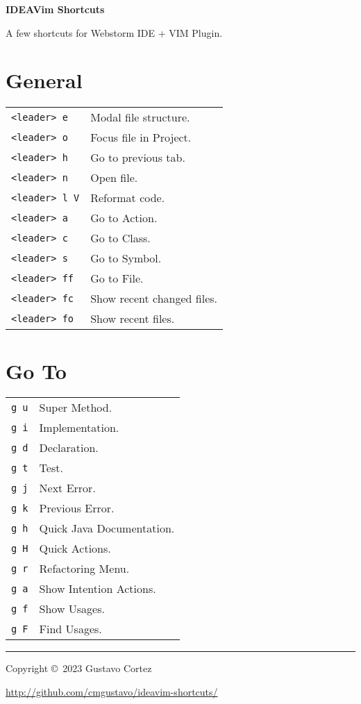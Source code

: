 \documentclass[10pt,landscape]{article}
\begin{document}
\begin{center}
     \Large{\textbf{IDEAVim Shortcuts}} \\
\end{center}

\begin{description}
  \item A few shortcuts for Webstorm IDE + VIM Plugin.
\end{description}


\begin{multicols}{2}

\section{General}
\begin{tabular}{@{}ll@{}}
\verb!<leader> e!    & Modal file structure. \\
\verb!<leader> o!    & Focus file in Project. \\
\verb!<leader> h!    & Go to previous tab. \\
\verb!<leader> n!    & Open file. \\
\verb!<leader> l V!  & Reformat code. \\
\verb!<leader> a!    & Go to Action. \\
\verb!<leader> c!    & Go to Class. \\
\verb!<leader> s!    & Go to Symbol. \\
\verb!<leader> ff!   & Go to File. \\
\verb!<leader> fc!   & Show recent changed files. \\
\verb!<leader> fo!   & Show recent files.
\end{tabular}

\section{Go To}
\begin{tabular}{@{}ll@{}}
  \verb!g u!    & Super Method. \\
  \verb!g i!    & Implementation. \\
  \verb!g d!    & Declaration. \\
  \verb!g t!    & Test. \\
  \verb!g j!    & Next Error. \\
  \verb!g k!    & Previous Error. \\
  \verb!g h!    & Quick Java Documentation. \\
  \verb!g H!    & Quick Actions. \\
  \verb!g r!    & Refactoring Menu. \\
  \verb!g a!    & Show Intention Actions. \\
  \verb!g f!    & Show Usages. \\
  \verb!g F!    & Find Usages.
\end{tabular}

\end{multicols}

\rule{\linewidth}{0.25pt}
\scriptsize

Copyright \copyright\ 2023 Gustavo Cortez

\href{http://github.com/cmgustavo/ideavim-shortcuts/}{http://github.com/cmgustavo/ideavim-shortcuts/}
\end{document}
